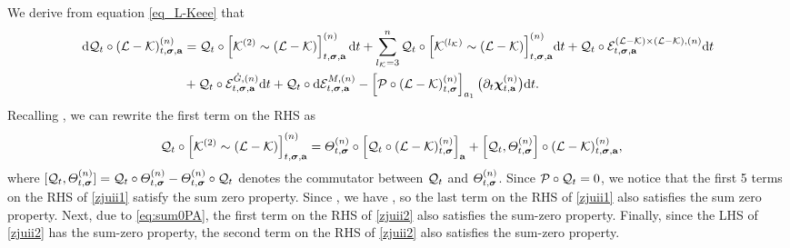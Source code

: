 We derive from equation \eqref{eq_L-Keee} that 
\begin{align} 
\dd{\cal Q}_t \circ (\mathcal{L} - \mathcal{K})^{(n)}_{t, \bsig, \ba} 
&= {\cal Q}_t \circ \left[{\cK}^{(2)} \sim (\mathcal{L} - \mathcal{K})\right]^{(n)}_{t, \bsig, \ba}\dd t 
    + \sum_{l_\mathcal{K}=3}^n {\cal Q}_t \circ \Big[{\cK}^{(\lenk)}\sim (\mathcal{L} - \mathcal{K})\Big]^{(n)}_{t, \bsig, \ba}\dd t + {\cal Q}_t \circ \mathcal{E}^{(\cL-\cK)\times(\cL-\cK),(n)}_{t, \bsig, \ba}\dd t \nonumber
    \\
& + {\cal Q}_t \circ \mathcal{E}^{\Gc,(n)}_{t, \bsig, \ba} \dd t
    + {\cal Q}_t \circ \dd\mathcal{E}^{M,(n)}_{t, \bsig, \ba} 
    - \left[{\cal P} \circ \left(\mathcal{L} - \mathcal{K}\right)^{(n)}_{t,\bsig}\right]_{a_1} \big(\partial_t \dthn_{t,\ba}^{(n)}\big) \dd t.\label{zjuii1}
\end{align} 
Recalling , we can rewrite the first term on the RHS as 
\begin{align}\label{zjuii2}
{\cal Q}_t \circ \Big[{\cK}^{(2)}\sim (\mathcal{L} - \mathcal{K})\Big]_{t, \bsig,\ba}^{(n)}
& = \varTheta^{(n)}_{t, \bsig} \circ \left[{\cal Q}_t \circ (\mathcal{L} - \mathcal{K})_{t, \bsig}^{(n)}\right]_{\ba} 
+ \left[{\cal Q}_t , \varTheta^{(n)}_{t, \bsig} \right] \circ (\mathcal{L} - \mathcal{K})_{t, \bsig, \ba}^{(n)},
\end{align}
where  $[{\cal Q}_t , \varTheta^{(n)}_{t, \bsig} ] = {\cal Q}_t \circ \varTheta^{(n)}_{t, \bsig} - \varTheta^{(n)}_{t, \bsig}\circ \cal Q_t$ denotes the commutator
between ${\cal Q}_t $ and $\varTheta^{(n)}_{t, \bsig}$. Since \({\cal P} \circ {\cal Q}_t = 0\), we notice that the first 5 terms on the RHS of \eqref{zjuii1} satisfy the sum zero property. 
Since , we have , so the last term on the RHS of \eqref{zjuii1} also satisfies the sum zero property.
Next, due to \eqref{eq:sum0PA}, the first term on the RHS of \eqref{zjuii2} also satisfies the sum-zero property. 
Finally, since the LHS of \eqref{zjuii2} has the sum-zero property, the second term on the RHS of \eqref{zjuii2} also satisfies the sum-zero property.

